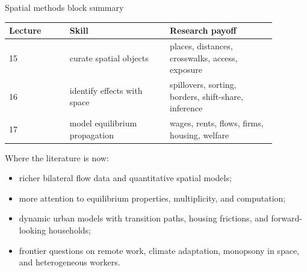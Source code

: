 \documentclass[aspectratio=169,11pt]{beamer}
\newcommand{\1}{\mathbf{1}}
\begin{document}
\begin{frame}{Spatial methods block summary}
\small
\begin{tabular}{p{0.20\linewidth} p{0.33\linewidth} p{0.35\linewidth}}
\toprule
Lecture & Skill & Research payoff \\
\midrule
15 & curate spatial objects & places, distances, crosswalks, access, exposure \\
16 & identify effects with space & spillovers, sorting, borders, shift-share, inference \\
17 & model equilibrium propagation & wages, rents, flows, firms, housing, welfare \\
\bottomrule
\end{tabular}

\medskip
Where the literature is now:
\begin{itemize}
    \item richer bilateral flow data and quantitative spatial models;
    \item more attention to equilibrium properties, multiplicity, and computation;
    \item dynamic urban models with transition paths, housing frictions, and forward-looking households;
    \item frontier questions on remote work, climate adaptation, monopsony in space, and heterogeneous workers.
\end{itemize}
\end{frame}
\end{document}
